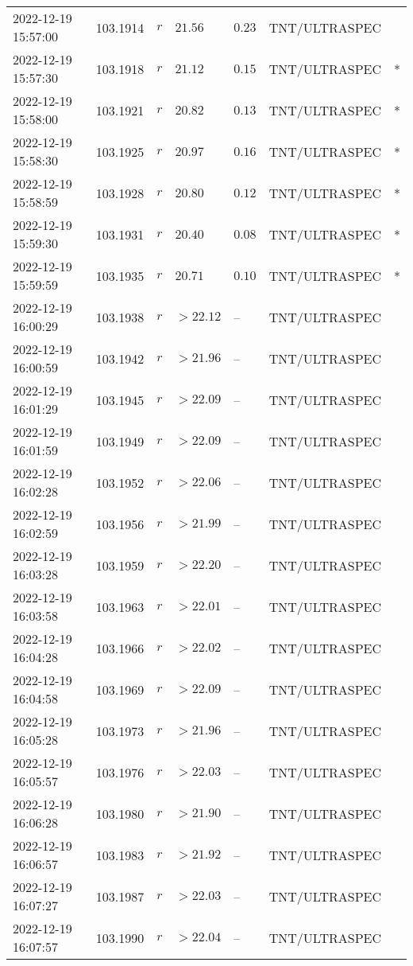 \documentclass{nature_plusfigure}
\begin{document}
\begin{supplement}
\begin{center}
\begin{longtable}{lllllll}
2022-12-19 15:57:00 & 103.1914 & $r$ & $21.56$ & $0.23$ & TNT/ULTRASPEC &  \\ 
2022-12-19 15:57:30 & 103.1918 & $r$ & $21.12$ & $0.15$ & TNT/ULTRASPEC & * \\ 
2022-12-19 15:58:00 & 103.1921 & $r$ & $20.82$ & $0.13$ & TNT/ULTRASPEC & * \\ 
2022-12-19 15:58:30 & 103.1925 & $r$ & $20.97$ & $0.16$ & TNT/ULTRASPEC & * \\ 
2022-12-19 15:58:59 & 103.1928 & $r$ & $20.80$ & $0.12$ & TNT/ULTRASPEC & * \\ 
2022-12-19 15:59:30 & 103.1931 & $r$ & $20.40$ & $0.08$ & TNT/ULTRASPEC & * \\ 
2022-12-19 15:59:59 & 103.1935 & $r$ & $20.71$ & $0.10$ & TNT/ULTRASPEC & * \\ 
2022-12-19 16:00:29 & 103.1938 & $r$ & $>22.12$ & -- & TNT/ULTRASPEC &  \\ 
2022-12-19 16:00:59 & 103.1942 & $r$ & $>21.96$ & -- & TNT/ULTRASPEC &  \\ 
2022-12-19 16:01:29 & 103.1945 & $r$ & $>22.09$ & -- & TNT/ULTRASPEC &  \\ 
2022-12-19 16:01:59 & 103.1949 & $r$ & $>22.09$ & -- & TNT/ULTRASPEC &  \\ 
2022-12-19 16:02:28 & 103.1952 & $r$ & $>22.06$ & -- & TNT/ULTRASPEC &  \\ 
2022-12-19 16:02:59 & 103.1956 & $r$ & $>21.99$ & -- & TNT/ULTRASPEC &  \\ 
2022-12-19 16:03:28 & 103.1959 & $r$ & $>22.20$ & -- & TNT/ULTRASPEC &  \\ 
2022-12-19 16:03:58 & 103.1963 & $r$ & $>22.01$ & -- & TNT/ULTRASPEC &  \\ 
2022-12-19 16:04:28 & 103.1966 & $r$ & $>22.02$ & -- & TNT/ULTRASPEC &  \\ 
2022-12-19 16:04:58 & 103.1969 & $r$ & $>22.09$ & -- & TNT/ULTRASPEC &  \\ 
2022-12-19 16:05:28 & 103.1973 & $r$ & $>21.96$ & -- & TNT/ULTRASPEC &  \\ 
2022-12-19 16:05:57 & 103.1976 & $r$ & $>22.03$ & -- & TNT/ULTRASPEC &  \\ 
2022-12-19 16:06:28 & 103.1980 & $r$ & $>21.90$ & -- & TNT/ULTRASPEC &  \\ 
2022-12-19 16:06:57 & 103.1983 & $r$ & $>21.92$ & -- & TNT/ULTRASPEC &  \\ 
2022-12-19 16:07:27 & 103.1987 & $r$ & $>22.03$ & -- & TNT/ULTRASPEC &  \\ 
2022-12-19 16:07:57 & 103.1990 & $r$ & $>22.04$ & -- & TNT/ULTRASPEC &  \\ 

\end{longtable}
\end{center}
\end{supplement}
\end{document}

